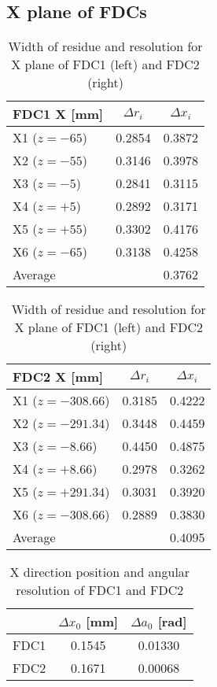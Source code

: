 \subsection{X plane of FDCs}
\begin{table}[h]
    \centering
\begin{tabular}{l|cc}
    \hline
    FDC1 X [mm]& $\Delta r_i$ & $\Delta x_i$ \\
    \hline 
    X1 ($z=-65$) &  0.2854 & 0.3872      \\
    X2 ($z=-55$) &  0.3146 & 0.3978      \\
    X3 ($z=-5$)  &  0.2841 & 0.3115      \\
    X4 ($z=+5$)  &  0.2892 & 0.3171      \\
    X5 ($z=+55$) &  0.3302 & 0.4176      \\
    X6 ($z=-65$) &  0.3138 & 0.4258      \\
    \hline
    Average & & 0.3762 \\
    \hline
\end{tabular}
\begin{tabular}{l|cc}
    \hline
    FDC2 X [mm]& $\Delta r_i$ & $\Delta x_i$ \\
    \hline 
    X1 ($z=-308.66$) &  0.3185 & 0.4222      \\
    X2 ($z=-291.34$) &  0.3448 & 0.4459      \\
    X3 ($z=-8.66$)   &  0.4450 & 0.4875      \\
    X4 ($z=+8.66$)   &  0.2978 & 0.3262      \\
    X5 ($z=+291.34$) &  0.3031 & 0.3920      \\
    X6 ($z=-308.66$) &  0.2889 & 0.3830      \\
    \hline
    Average & & 0.4095\\
    \hline
\end{tabular}
\caption{Width of residue and resolution for X plane of FDC1 (left) and FDC2 (right)}
\end{table}

\begin{table}[h]
    \centering
    \begin{tabular}{c|cc}
        \hline
            & $\Delta x_0$ [mm] & $\Delta a_0$ [rad]\\
            \hline
            FDC1 & 0.1545 & 0.01330 \\
            FDC2 & 0.1671 & 0.00068 \\
            \hline
    \end{tabular}
    \caption{X direction position and angular resolution of FDC1 and FDC2}
\end{table}

